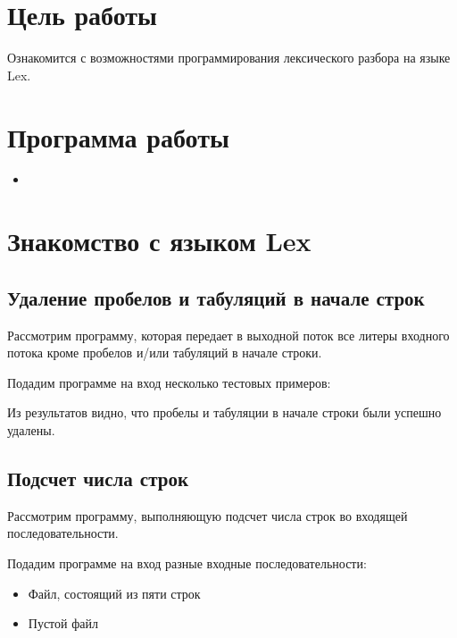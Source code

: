 





\tableofcontents
\newpage

\section{Цель работы}

Ознакомится с возможностями программирования лексического разбора на языке Lex.

\section{Программа работы}

\begin{itemize}
	\item 
\end{itemize}

\section{Знакомство с языком Lex}

\subsection{Удаление пробелов и табуляций в начале строк}

Рассмотрим программу, которая передает в выходной поток все литеры входного потока кроме пробелов и/или табуляций в начале строки.


Подадим программе на вход несколько тестовых примеров:


Из результатов видно, что пробелы и табуляции в начале строки были успешно удалены.

\subsection{Подсчет числа строк}

Рассмотрим программу, выполняющую подсчет числа строк во входящей последовательности.


Подадим программе на вход разные входные последовательности:
\begin{itemize}
	\item Файл, состоящий из пяти строк
	\item Пустой файл
\end{itemize}

